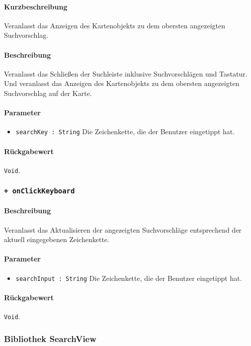 \paragraph*{Kurzbeschreibung}
Veranlasst das Anzeigen des Kartenobjekts zu dem obersten angezeigten Suchvorschlag.
\paragraph*{Beschreibung}
Veranlasst das Schließen der Suchleiste inklusive Suchvorschlägen und Tastatur.
Und veranlasst das Anzeigen des Kartenobjekts zu dem obersten angezeigten Suchvorschlag auf der Karte.
\paragraph*{Parameter}
\begin{itemize}
    \item \texttt{searchKey : String} Die Zeichenkette, die der Benutzer eingetippt hat.
\end{itemize}
\paragraph*{Rückgabewert}
\texttt{Void}.

\subsubsection*{\texttt{+ onClickKeyboard}}\label{App_Search_SearchScreen_onClickKeyboard}%
\paragraph*{Beschreibung}
Veranlasst das Aktualisieren der angezeigten Suchvorschläge entsprechend der aktuell eingegebenen Zeichenkette.
\paragraph*{Parameter}
\begin{itemize}
    \item \texttt{searchInput : String} Die Zeichenkette, die der Benutzer eingetippt hat.
\end{itemize}
\paragraph*{Rückgabewert}
\texttt{Void}.


\subsubsection*{Bibliothek SearchView}
